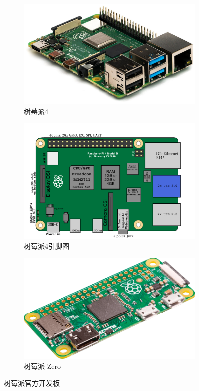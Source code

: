 \documentclass[scheme=chinese,a4paper]{article}
\begin{document}
\begin{figure}[H]
  \begin{subfigure}[t]{0.33\textwidth}
    \includegraphics[width=\textwidth]{rasp_4.jpg}
    \caption{树莓派4}
  \end{subfigure}
  \begin{subfigure}[t]{0.33\textwidth}
    \includegraphics[width=\textwidth]{RaspberryPi_Model_4B.png}
    \caption{树莓派4引脚图}
  \end{subfigure}
  \begin{subfigure}[t]{0.3\textwidth}
    \includegraphics[width=\textwidth]{RASP_PI_ZERO.png}
    \caption{树莓派 Zero}
  \end{subfigure}
  \caption{树莓派官方开发板}
\end{figure}
\end{document}
